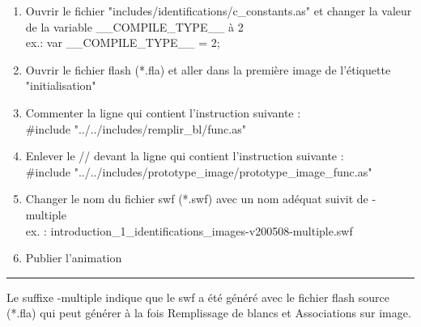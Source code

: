 \documentclass[letterpaper]{article}
\begin{document}
\begin{enumerate}
\item Ouvrir le fichier "includes/identifications/c\_constants.as" et changer la valeur de la variable \_\_COMPILE\_TYPE\_\_ à 2 \\
ex.: var \_\_COMPILE\_TYPE\_\_ = 2;

\item Ouvrir le fichier flash (*.fla) et aller dans la première image de l'étiquette "initialisation"

\item Commenter la ligne qui contient l'instruction suivante :\\
\#include "../../includes/remplir\_bl/func.as"

\item Enlever le // devant la ligne qui contient l'instruction suivante :\\
\#include "../../includes/prototype\_image/prototype\_image\_func.as"

\item 
Changer le nom du fichier swf (*.swf) avec un nom adéquat suivit de -multiple \\
ex. : introduction\_1\_identifications\_images-v200508-multiple.swf

\item 
Publier l'animation

\end{enumerate}

\vspace{1cm}
\hrule
Le suffixe -multiple indique que le swf a été généré avec le fichier flash source (*.fla) qui peut générer à la fois Remplissage de blancs et Associations sur image.
\end{document}
